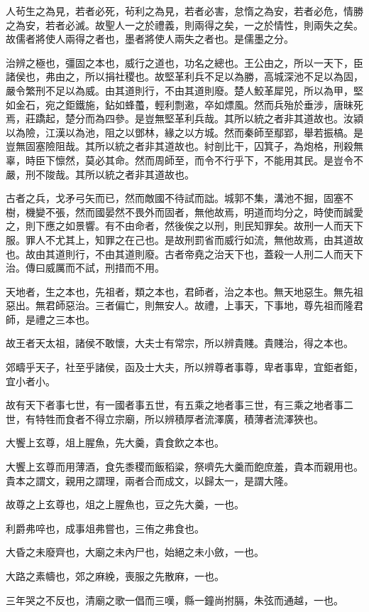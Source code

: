 人茍生之為見，若者必死，茍利之為見，若者必害，怠惰之為安，若者必危，情勝之為安，若者必滅。故聖人一之於禮義，則兩得之矣，一之於情性，則兩失之矣。故儒者將使人兩得之者也，墨者將使人兩失之者也。是儒墨之分。

治辨之極也，彊固之本也，威行之道也，功名之總也。王公由之，所以一天下，臣諸侯也，弗由之，所以捐社稷也。故堅革利兵不足以為勝，高城深池不足以為固，嚴令繁刑不足以為威。由其道則行，不由其道則廢。楚人鮫革犀兕，所以為甲，堅如金石，宛之鉅鐵施，鉆如蜂蠆，輕利剽遫，卒如熛風。然而兵殆於垂涉，唐昧死焉，莊蹻起，楚分而為四參。是豈無堅革利兵哉。其所以統之者非其道故也。汝潁以為險，江漢以為池，阻之以鄧林，緣之以方城。然而秦師至鄢郢，舉若振槁。是豈無固塞險阻哉。其所以統之者非其道故也。紂剖比干，囚箕子，為炮格，刑殺無辜，時臣下懔然，莫必其命。然而周師至，而令不行乎下，不能用其民。是豈令不嚴，刑不陖哉。其所以統之者非其道故也。

古者之兵，戈矛弓矢而已，然而敵國不待試而詘。城郭不集，溝池不掘，固塞不樹，機變不張，然而國晏然不畏外而固者，無他故焉，明道而均分之，時使而誠愛之，則下應之如景響。有不由命者，然後俟之以刑，則民知罪矣。故刑一人而天下服。罪人不尤其上，知罪之在己也。是故刑罰省而威行如流，無他故焉，由其道故也。故由其道則行，不由其道則廢。古者帝堯之治天下也，蓋殺一人刑二人而天下治。傳曰威厲而不試，刑措而不用。

天地者，生之本也，先祖者，類之本也，君師者，治之本也。無天地惡生。無先祖惡出。無君師惡治。三者偏亡，則無安人。故禮，上事天，下事地，尊先祖而隆君師，是禮之三本也。

故王者天太祖，諸侯不敢懷，大夫士有常宗，所以辨貴賤。貴賤治，得之本也。

郊疇乎天子，社至乎諸侯，函及士大夫，所以辨尊者事尊，卑者事卑，宜鉅者鉅，宜小者小。

故有天下者事七世，有一國者事五世，有五乘之地者事三世，有三乘之地者事二世，有特牲而食者不得立宗廟，所以辨積厚者流澤廣，積薄者流澤狹也。

大饗上玄尊，俎上腥魚，先大羹，貴食飲之本也。

大饗上玄尊而用薄酒，食先黍稷而飯稻粱，祭嚌先大羹而飽庶羞，貴本而親用也。貴本之謂文，親用之謂理，兩者合而成文，以歸太一，是謂大隆。

故尊之上玄尊也，俎之上腥魚也，豆之先大羹，一也。
		
利爵弗啐也，成事俎弗嘗也，三侑之弗食也。
		
大昏之未廢齊也，大廟之未內尸也，始絕之未小斂，一也。
		
大路之素幬也，郊之麻絻，喪服之先散麻，一也。
		
三年哭之不反也，清廟之歌一倡而三嘆，縣一鐘尚拊膈，朱弦而通越，一也。

